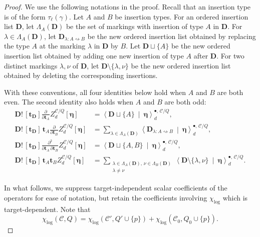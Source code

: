 \documentclass[10pt,a4paper]{amsart}
\newcommand{\cC}{\mathcal C}
\begin{document}
\begin{proof}

We use the following notations in the proof. Recall that an insertion type is of the form \(\tau_\ell(\gamma)\).
Let \(A\) and \(B\) be insertion types.
For an ordered insertion list \(\mathbf D\), let
\(\Lambda_A(\mathbf D)\) be the set of markings with insertion of type
\(A\) in \(\mathbf D\).  For
\(\lambda\in\Lambda_A(\mathbf D)\), let
\(\mathbf D_{\lambda:A\rightsquigarrow B}\) be the new ordered insertion list obtained by replacing the type \(A\) at the
marking \(\lambda\) in $\mathbf D$ by \(B\).  Let
\(\mathbf D\sqcup\{A\}\) be the  new ordered insertion list obtained by adding one new insertion of type \(A\) after $\mathbf D$.
For two distinct markings \(\lambda,\nu\) of \(\mathbf D\), let
\(\mathbf D\setminus\{\lambda,\nu\}\) be the new  ordered insertion list obtained by deleting the corresponding insertions. 

With these conventions, all four identities below hold when \(A\) and \(B\) are
both even.  The second identity also holds when \(A\) and \(B\) are
both odd:
\begin{align*}
\mathbf D!\,[\mathbf t_{\mathbf D}]\frac{\partial}{\partial\mathbf t_A} Z_d^{\cC/Q}[\boldsymbol\eta]&=\left\langle\mathbf D\sqcup\{A\}\ \middle|\ \boldsymbol\eta\right\rangle_d^{\bullet,\,\cC/Q},\\
\mathbf D!\,[\mathbf t_{\mathbf D}]\,\mathbf t_A\frac{\partial}{\partial\mathbf t_B} Z_d^{\cC/Q}[\boldsymbol\eta]&=\sum_{\lambda\in\Lambda_A(\mathbf D)}\left\langle\mathbf D_{\lambda:A\rightsquigarrow B}\ \middle|\ \boldsymbol\eta\right\rangle_d^{\bullet,\,\cC/Q},\\
\mathbf D!\,[\mathbf t_{\mathbf D}]\frac{\partial^2 }{\partial\mathbf t_A\,\partial\mathbf t_B}Z_d^{\cC/Q}[\boldsymbol\eta]&=\left\langle\mathbf D\sqcup\{A,B\}\ \middle|\ \boldsymbol\eta\right\rangle_d^{\bullet,\,\cC/Q},\\
\mathbf D!\,[\mathbf t_{\mathbf D}]\,\mathbf t_A\mathbf t_B Z_d^{\cC/Q}[\boldsymbol\eta]&=\sum_{\substack{\lambda\in\Lambda_A(\mathbf D),\,\nu\in\Lambda_B(\mathbf D)\\ \lambda\ne\nu}}\left\langle\mathbf D\setminus\{\lambda,\nu\}\ \middle|\ \boldsymbol\eta\right\rangle_d^{\bullet,\,\cC/Q}.
\end{align*}

In what follows, we suppress target-independent scalar coefficients of the operators for ease of notation, but retain
the coefficients involving \(\chi_{\log}\) which is target-dependent. Note that
\begin{equation}\label{eq:chi-log-degeneration-in-proof}
\chi_{\log}(\cC,Q)=\chi_{\log}(\cC',Q'\cup\{p\})+\chi_{\log}(\cC_0,Q_0\cup\{p\}).
\end{equation}


\end{proof}
\end{document}
